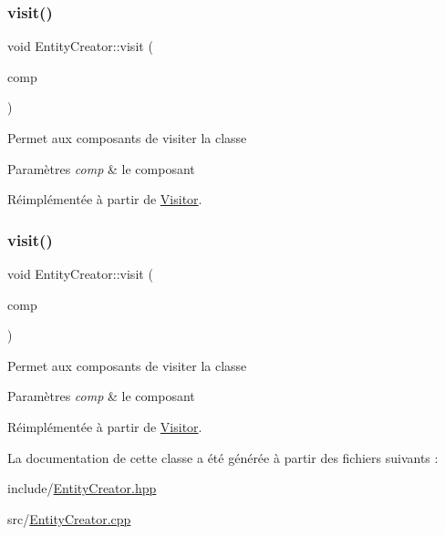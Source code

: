 \subsubsection{\texorpdfstring{visit()}{visit()}\hspace{0.1cm}{\footnotesize\ttfamily [4/5]}}
{\footnotesize\ttfamily void Entity\+Creator\+::visit (\begin{DoxyParamCaption}\item[{\hyperlink{structArmorComponent}{Armor\+Component} \&}]{comp }\end{DoxyParamCaption})\hspace{0.3cm}{\ttfamily [virtual]}}

Permet aux composants de visiter la classe


\begin{DoxyParams}{Paramètres}
{\em comp} & le composant \\
\hline
\end{DoxyParams}


Réimplémentée à partir de \hyperlink{classVisitor_a05ce14929a5c30d182b46f8843605468}{Visitor}.

\mbox{\label{classEntityCreator_aee1042f0ec1dc1310ab4c0096d09e094}} 
\subsubsection{\texorpdfstring{visit()}{visit()}\hspace{0.1cm}{\footnotesize\ttfamily [5/5]}}
{\footnotesize\ttfamily void Entity\+Creator\+::visit (\begin{DoxyParamCaption}\item[{\hyperlink{structSpeedComponent}{Speed\+Component} \&}]{comp }\end{DoxyParamCaption})\hspace{0.3cm}{\ttfamily [virtual]}}

Permet aux composants de visiter la classe


\begin{DoxyParams}{Paramètres}
{\em comp} & le composant \\
\hline
\end{DoxyParams}


Réimplémentée à partir de \hyperlink{classVisitor_a42ce8ce5e7c789dc4b919a088e68829b}{Visitor}.



La documentation de cette classe a été générée à partir des fichiers suivants \+:\begin{DoxyCompactItemize}
\item 
include/\hyperlink{EntityCreator_8hpp}{Entity\+Creator.\+hpp}\item 
src/\hyperlink{EntityCreator_8cpp}{Entity\+Creator.\+cpp}\end{DoxyCompactItemize}
